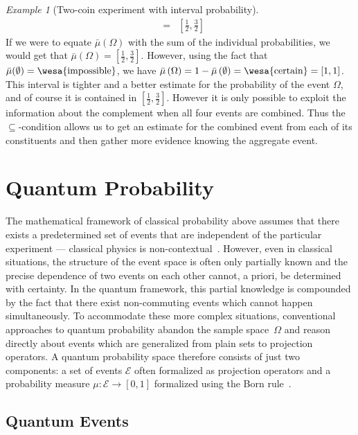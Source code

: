 \documentclass{article}
\theoremstyle{remark}
\newtheorem{example}{Example}
\newcommand{\qevents}{\ensuremath{\mathcal{E}}}
\newcommand{\imposs}{{\mbox{\wesa{impossible}}}}
\newcommand{\necess}{{\mbox{\wesa{certain}}}}
\begin{document}
\begin{example}[Two-coin experiment with interval probability]
\begin{eqnarray*}
&=& \left[\frac{1}{2},\frac{3}{2}\right]
\end{eqnarray*}
If we were to equate $\bar{\mu}(\Omega)$ with the sum of the individual
probabilities, we would get that $\bar{\mu}(\Omega)=\left[\frac{1}{2},\frac{3}{2}\right]$.
However, using the fact that $\bar{\mu}(\emptyset)=\imposs$, we have
$\bar{\mu}\left(\Omega\right)=1-\bar{\mu}\left(\emptyset\right)=\necess=[1,1]$.
This interval is tighter and a better estimate for the probability
of the event $\Omega$, and of course it is contained in $[\frac{1}{2},\frac{3}{2}]$.
However it is only possible to exploit the information about the complement
when all four events are combined. Thus the $\subseteq$-condition
allows us to get an estimate for the combined event from each of its
constituents and then gather more evidence knowing the aggregate
event.
\end{example}

\section{Quantum Probability}
 
The mathematical framework of classical probability above assumes that
there exists a predetermined set of events that are independent of the
particular experiment --- classical physics is
non-contextual~\cite{kochenspecker1967,Redhead1987-REDINA,peres1995quantum,Jaeger2007}. 
However, even in classical situations, the structure
of the event space is often only partially known and the precise
dependence of two events on each other cannot, a priori, be determined
with certainty. In the quantum framework, this partial knowledge is
compounded by the fact that there exist non-commuting events which
cannot happen simultaneously. To accommodate these more complex
situations, conventional approaches to quantum probability abandon the
sample space~$\Omega$ and reason directly about events which are
generalized from plain sets to projection operators. A quantum
probability space therefore consists of just two components: a set of
events $\qevents$ often formalized as projection operators and a
probability measure $\mu:\qevents\rightarrow[0,1]$ formalized using
the Born rule~\cite{Born1983,Mermin2007,Jaeger2007}.

\subsection{Quantum Events}
\end{document}
